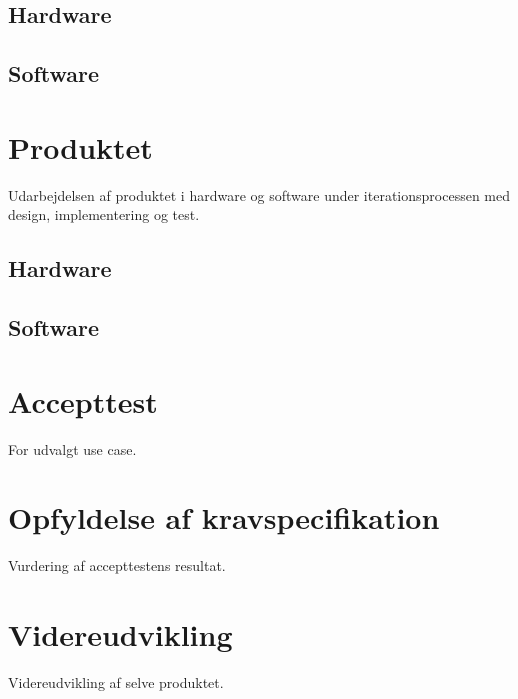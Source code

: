 \subsection{Hardware}

\subsection{Software}


\section{Produktet}

Udarbejdelsen af produktet i hardware og software under iterationsprocessen med design, implementering og test.

\subsection{Hardware}

\subsection{Software}


\section{Accepttest}

For udvalgt use case.


\section{Opfyldelse af kravspecifikation}
Vurdering af accepttestens resultat.


\section{Videreudvikling}
Videreudvikling af selve produktet.
